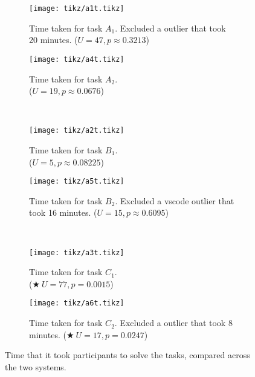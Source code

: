 \documentclass[../thesis]{subfiles}
\begin{document}
\begin{figure}
	\begin{subfigure}[T]{0.5\textwidth}
		\caption{Time taken for task $A_1$. Excluded a \SEE{} outlier that took 20 minutes.
			($U = 47, p \approx 0.3213$)
			\label{fig:a1t}}
		\texttt{[image: tikz/a1t.tikz]}
	\end{subfigure}\hfill
	\begin{subfigure}[T]{0.5\textwidth}
		\caption{Time taken for task $A_2$.\\
			($U = 19, p \approx 0.0676$)\label{fig:a2t}}
		\texttt{[image: tikz/a4t.tikz]}
	\end{subfigure}\\
	\begin{subfigure}[T]{0.5\textwidth}
		\caption{Time taken for task $B_1$.\\
			($U = 5, p \approx 0.08225$)\label{fig:b1t}}
		\texttt{[image: tikz/a2t.tikz]}
	\end{subfigure}\hfill
	\begin{subfigure}[T]{0.5\textwidth}
		\caption{Time taken for task $B_2$. Excluded a \gls{vscode} outlier that took 16 minutes.
			($U = 15, p \approx 0.6095$)\label{fig:b2t}}
		\texttt{[image: tikz/a5t.tikz]}
	\end{subfigure}\\
	\begin{subfigure}[T]{0.5\textwidth}
		\caption{Time taken for task $C_1$.\\
			($\bigstar\ U = 77, p = 0.0015$)\label{fig:c1t}}
		\texttt{[image: tikz/a3t.tikz]}
	\end{subfigure}\hfill
	\begin{subfigure}[T]{0.5\textwidth}
		\caption{Time taken for task $C_2$. Excluded a \SEE{} outlier that took 8 minutes.
			($\bigstar\ U = 17, p = 0.0247$)\label{fig:c2t}}
		\texttt{[image: tikz/a6t.tikz]}
	\end{subfigure}
	\caption{Time that it took participants to solve the tasks, compared across the two systems.}\label{fig:time}
\end{figure}
\end{document}
